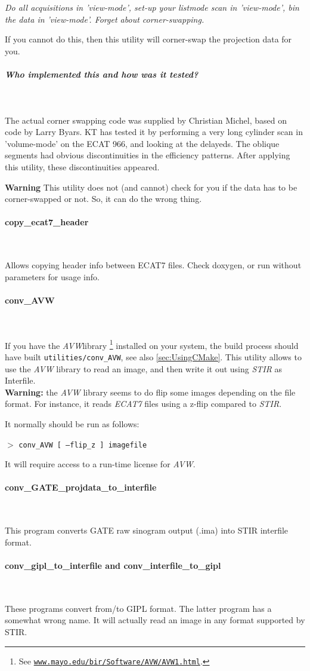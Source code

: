 \documentclass{article}
\def\url#1#2{\mbox{\href{#1}{\tt #2}}}
\newcommand{\subsubsubsection}[1]{\paragraph{#1}\mbox{} \\}
\newcommand{\subsubsubsubsection}[1]{\subparagraph{#1} \mbox{} \\}
\newcommand{\cmdline}[1]{\par \noindent $>$ \texttt{#1}\par}
\begin{document}
{\textit{Do all acquisitions in 'view-mode', set-up your listmode 
scan in 'view-mode', bin the data in 'view-mode'. Forget about 
corner-swapping.}


If you cannot do this, then this utility will corner-swap the 
projection data for you.

{ \subsubsubsubsection{Who implemented this and how was it tested?}
}
The actual corner swapping code was supplied by Christian Michel, 
based on code by Larry Byars. KT has tested it by performing 
a very long cylinder scan in 'volume-mode' on the ECAT 966, and 
looking at the delayeds. The oblique segments had obvious discontinuities 
in the efficiency patterns. After applying this utility, these 
discontinuities appeared.



\textbf{Warning} This utility does not (and cannot) check for you 
if the data has to be corner-swapped or not. So, it can do the 
wrong thing.

{ \subsubsubsection{copy\_ecat7\_header}
}
Allows copying header info between ECAT7 files. Check doxygen, or run without 
parameters for usage info.

{ \subsubsubsection{conv\_AVW}
}
\label{sec:convAVW}
If you have the \textit{AVW}\texttrademark  library
\footnote{See \url{http://www.mayo.edu/bir/Software/AVW/AVW1.html}
{www.mayo.edu/bir/Software/AVW/AVW1.html}.
} installed on your system, the build process should have built \texttt{utilities/conv\_AVW},
see also \ref{sec:UsingCMake}.
This utility allows to use the \textit{AVW} library to read an image, and then write it out
using \textit{STIR} as Interfile.\\
\textbf{Warning:} the \textit{AVW} library seems to do flip some images depending
on the file format. For instance, it reads \textit{ECAT7} files using a z-flip compared
to \textit{STIR}.

It normally should be run as follows:
\cmdline{conv\_AVW [ --flip\_z ] imagefile}

It will require access to a run-time license for \textit{AVW}.

{ \subsubsubsection{conv\_GATE\_projdata\_to\_interfile}
}
This program converts GATE raw sinogram output (.ima) into STIR interfile format. 

{ \subsubsubsection{conv\_gipl\_to\_interfile and conv\_interfile\_to\_gipl}
}
These programs convert from/to GIPL format. The latter program has a somewhat wrong name.
It will actually read an image in any format supported by STIR.


}
\end{document}
